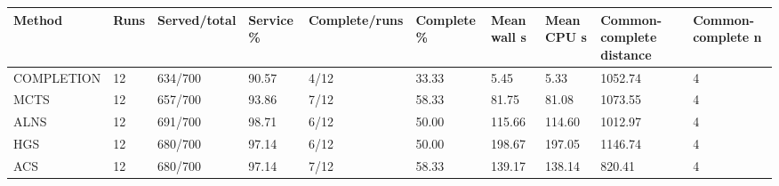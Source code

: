 \begin{tabular}{llllllllll}
\hline
Method & Runs & Served/total & Service \% & Complete/runs & Complete \% & Mean wall s & Mean CPU s & Common-complete distance & Common-complete n \\
\hline
COMPLETION & 12 & 634/700 & 90.57 & 4/12 & 33.33 & 5.45 & 5.33 & 1052.74 & 4 \\
MCTS & 12 & 657/700 & 93.86 & 7/12 & 58.33 & 81.75 & 81.08 & 1073.55 & 4 \\
ALNS & 12 & 691/700 & 98.71 & 6/12 & 50.00 & 115.66 & 114.60 & 1012.97 & 4 \\
HGS & 12 & 680/700 & 97.14 & 6/12 & 50.00 & 198.67 & 197.05 & 1146.74 & 4 \\
ACS & 12 & 680/700 & 97.14 & 7/12 & 58.33 & 139.17 & 138.14 & 820.41 & 4 \\
\hline
\end{tabular}
